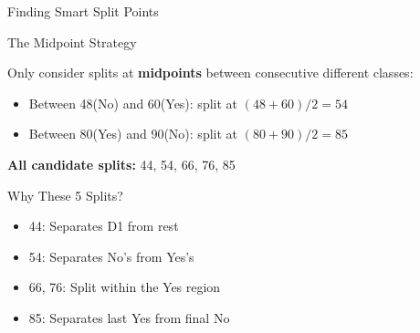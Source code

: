 \documentclass[usenames,dvipsnames]{beamer}
\begin{document}
\begin{frame}{Finding Smart Split Points}
\begin{definitionbox}{The Midpoint Strategy}
    \scriptsize

Only consider splits at \textbf{midpoints} between consecutive different classes:
\begin{itemize}
\item Between 48(No) and 60(Yes): split at $(48+60)/2 = 54$
\item Between 80(Yes) and 90(No): split at $(80+90)/2 = 85$
\end{itemize}
\end{definitionbox}

\textbf{All candidate splits:} 44, 54, 66, 76, 85

\begin{keypointsbox}{Why These 5 Splits?}
\scriptsize

\begin{itemize}
\item 44: Separates D1 from rest
\item 54: Separates No's from Yes's  
\item 66, 76: Split within the Yes region
\item 85: Separates last Yes from final No
\end{itemize}
\end{keypointsbox}
    \end{frame}
\end{document}
